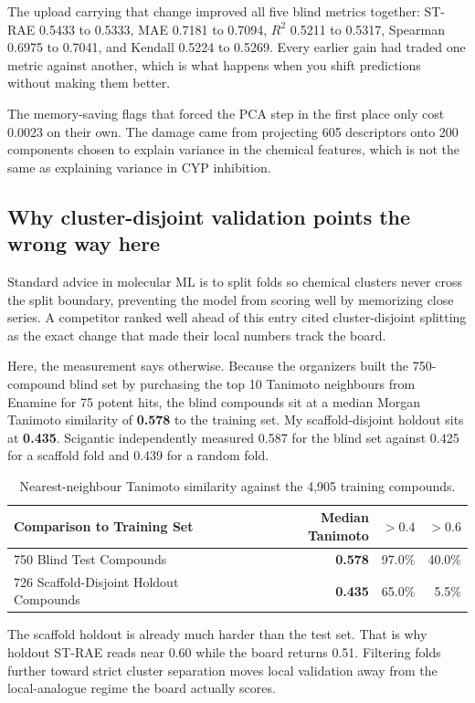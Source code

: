\documentclass[11pt]{article}
\begin{document}
The upload carrying that change improved all five blind metrics together: ST-RAE 0.5433 to 0.5333, MAE 0.7181 to 0.7094, $R^2$ 0.5211 to 0.5317, Spearman 0.6975 to 0.7041, and Kendall 0.5224 to 0.5269. Every earlier gain had traded one metric against another, which is what happens when you shift predictions without making them better.

The memory-saving flags that forced the PCA step in the first place only cost 0.0023 on their own. The damage came from projecting 605 descriptors onto 200 components chosen to explain variance in the chemical features, which is not the same as explaining variance in CYP inhibition.

\subsection{Why cluster-disjoint validation points the wrong way here}
Standard advice in molecular ML is to split folds so chemical clusters never cross the split boundary, preventing the model from scoring well by memorizing close series. A competitor ranked well ahead of this entry cited cluster-disjoint splitting as the exact change that made their local numbers track the board.

Here, the measurement says otherwise. Because the organizers built the 750-compound blind set by purchasing the top 10 Tanimoto neighbours from Enamine for 75 potent hits, the blind compounds sit at a median Morgan Tanimoto similarity of \textbf{0.578} to the training set. My scaffold-disjoint holdout sits at \textbf{0.435}. Scigantic independently measured 0.587 for the blind set against 0.425 for a scaffold fold and 0.439 for a random fold.

\begin{table}[H]
\centering
\small
\begin{tabular}{lrrr}
\toprule
Comparison to Training Set & Median Tanimoto & $> 0.4$ & $> 0.6$ \\
\midrule
750 Blind Test Compounds & \textbf{0.578} & 97.0\% & 40.0\% \\
726 Scaffold-Disjoint Holdout Compounds & \textbf{0.435} & 65.0\% & 5.5\% \\
\bottomrule
\end{tabular}
\caption{Nearest-neighbour Tanimoto similarity against the 4,905 training compounds.}
\label{tab:tanimoto}
\end{table}

The scaffold holdout is already much harder than the test set. That is why holdout ST-RAE reads near 0.60 while the board returns 0.51. Filtering folds further toward strict cluster separation moves local validation away from the local-analogue regime the board actually scores.
\end{document}
